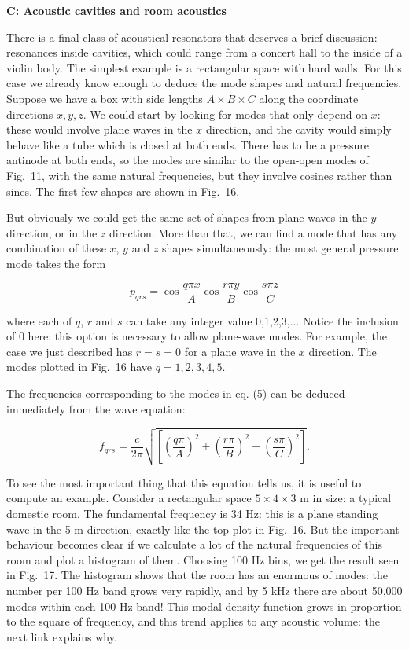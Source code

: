   \textbf{C: Acoustic cavities and room acoustics} 

  There is a final class of acoustical resonators that deserves a brief 
  discussion: resonances inside cavities, which could range from a concert hall 
  to the inside of a violin body. The simplest example is a rectangular space 
  with hard walls. For this case we already know enough to deduce the mode 
  shapes and natural frequencies. Suppose we have a box with side lengths $A 
  \times B \times C$ along the coordinate directions $x,y,z$. We could start by 
  looking for modes that only depend on $x$: these would involve plane waves in 
  the $x$ direction, and the cavity would simply behave like a tube which is 
  closed at both ends. There has to be a pressure antinode at both ends, so the 
  modes are similar to the open-open modes of Fig.\ 11, with the same natural 
  frequencies, but they involve cosines rather than sines. The first few shapes 
  are shown in Fig.\ 16. 

  But obviously we could get the same set of shapes from plane waves in the $y$ 
  direction, or in the $z$ direction. More than that, we can find a mode that 
  has any combination of these $x$, $y$ and $z$ shapes simultaneously: the most 
  general pressure mode takes the form 

  $$p_{qrs}=\cos \frac{q \pi x}{A} \cos \frac{r \pi y}{B} \cos \frac{s \pi 
  z}{C} \tag{5}$$ 

  where each of $q$, $r$ and $s$ can take any integer value 0,1,2,3,... Notice 
  the inclusion of 0 here: this option is necessary to allow plane-wave modes. 
  For example, the case we just described has $r=s=0$ for a plane wave in the 
  $x$ direction. The modes plotted in Fig.\ 16 have $q=1,2,3,4,5$. 

  The frequencies corresponding to the modes in eq. (5) can be deduced 
  immediately from the wave equation: 

  $$f_{qrs}=\frac{c}{2 \pi} \sqrt{\left[ \left( \dfrac{q \pi}{A} \right)^2 + 
  \left( \dfrac{r \pi}{B} \right)^2 + \left( \dfrac{s \pi}{C} \right)^2 \right] 
  } . \tag{6}$$ 

  To see the most important thing that this equation tells us, it is useful to 
  compute an example. Consider a rectangular space $5 \times 4 \times 3$ m in 
  size: a typical domestic room. The fundamental frequency is 34 Hz: this is a 
  plane standing wave in the 5 m direction, exactly like the top plot in Fig.\ 
  16. But the important behaviour becomes clear if we calculate a lot of the 
  natural frequencies of this room and plot a histogram of them. Choosing 100 
  Hz bins, we get the result seen in Fig.\ 17. The histogram shows that the 
  room has an enormous of modes: the number per 100 Hz band grows very rapidly, 
  and by 5 kHz there are about 50,000 modes within each 100 Hz band! This modal 
  density function grows in proportion to the square of frequency, and this 
  trend applies to any acoustic volume: the next link explains why. 

